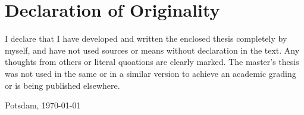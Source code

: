 
\chapter*{Declaration of Originality}
I declare that I have developed and written the enclosed thesis completely by myself, and have not used sources or means without declaration in the text. Any thoughts from others or literal quoations are clearly marked. The master's thesis was not used in the same or in a similar version to achieve an academic grading or is being published elsewhere.

\vspace{1cm}
Potsdam, \today

\vspace{1.5cm}
\AUTHOR
